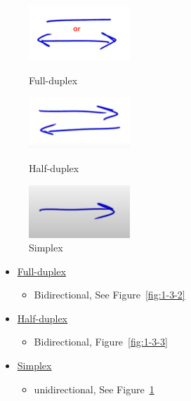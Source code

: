 \documentclass[12pt]{ctexart}   %
\begin{document}
		\begin{figure}
			\begin{minipage}[t]{0.3\linewidth}
				\centering
				\includegraphics[width=1.5in]{images/1-3-2}
				\caption{Full-duplex}
				\label{fig:1-3-2}
			\end{minipage}
			\begin{minipage}[t]{0.3\linewidth}
				\centering
				\includegraphics[width=1.5in]{images/1-3-3}
				\caption{Half-duplex}
				\label{fig:1-3-3}
			\end{minipage}
			\begin{minipage}[t]{0.3\linewidth}
				\centering
				\includegraphics[width=1.5in]{images/1-3-4}
				\caption{Simplex}
				\label{fig:1-3-4}
			\end{minipage}
		\end{figure}
		
	\begin{itemize}
		\item \underline{Full-duplex}
		\begin{itemize}
			\item Bidirectional, See Figure~\ref{fig:1-3-2}
		\end{itemize}
		
		\item \underline{Half-duplex}
		\begin{itemize}
			\item Bidirectional, Figure~\ref{fig:1-3-3}
		\end{itemize}
		
		\item \underline{Simplex}
		\begin{itemize}
			\item unidirectional, See Figure~\ref{fig:1-3-4}
		\end{itemize}
		
	\end{itemize}
	
\end{document}
